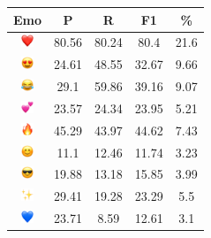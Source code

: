 \documentclass{article}
\begin{document}
\begin{table}
\centering
\begin{tabular}{|c|ccc|c|} \hline
\textbf{Emo} & \textbf{P} & \textbf{R} & \textbf{F1} & \textbf{\%} \\ \hline
\includegraphics[height=0.37cm,width=0.37cm]{img/red_heart.png} & 80.56 & 80.24 & 80.4 & 21.6\\ 
\includegraphics[height=0.37cm,width=0.37cm]{img/smiling_face_with_hearteyes.png} & 24.61 & 48.55 & 32.67 & 9.66\\ 
\includegraphics[height=0.37cm,width=0.37cm]{img/face_with_tears_of_joy.png} & 29.1 & 59.86 & 39.16 & 9.07\\ 
\includegraphics[height=0.37cm,width=0.37cm]{img/two_hearts.png} & 23.57 & 24.34 & 23.95 & 5.21\\ 
\includegraphics[height=0.37cm,width=0.37cm]{img/fire.png} & 45.29 & 43.97 & 44.62 & 7.43\\ 
\includegraphics[height=0.37cm,width=0.37cm]{img/smiling_face_with_smiling_eyes.png} & 11.1 & 12.46 & 11.74 & 3.23\\ 
\includegraphics[height=0.37cm,width=0.37cm]{img/smiling_face_with_sunglasses.png} & 19.88 & 13.18 & 15.85 & 3.99\\ 
\includegraphics[height=0.37cm,width=0.37cm]{img/sparkles.png} & 29.41 & 19.28 & 23.29 & 5.5\\ 
\includegraphics[height=0.37cm,width=0.37cm]{img/blue_heart.png} & 23.71 & 8.59 & 12.61 & 3.1\\ 

\end{tabular}
\end{table}
\end{document}
